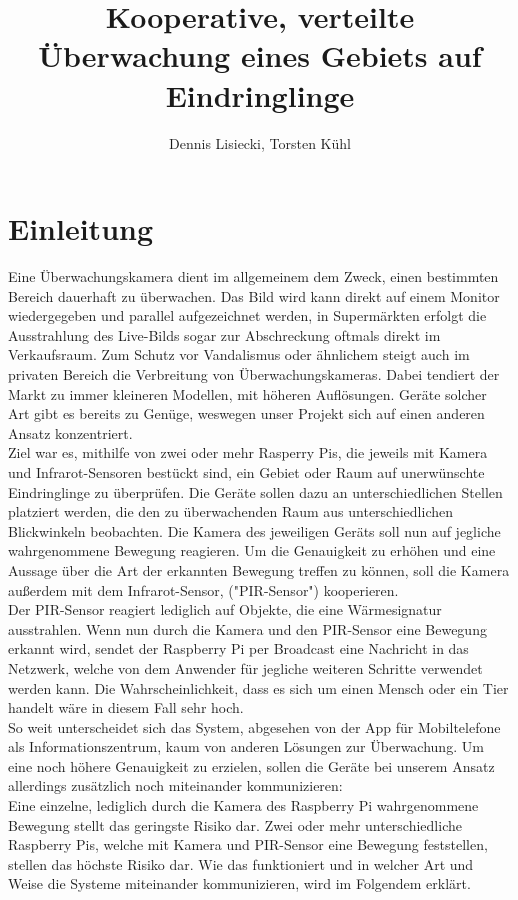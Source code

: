 \documentclass[journal]{IEEEtran}
\title{Kooperative, verteilte Überwachung eines Gebiets auf Eindringlinge}		%
\author{Dennis Lisiecki, Torsten Kühl}								%
\begin{document}

\maketitle	%


\section{Einleitung}
Eine Überwachungskamera dient im allgemeinem dem Zweck, einen bestimmten Bereich dauerhaft zu überwachen. Das Bild wird kann direkt auf einem Monitor wiedergegeben und parallel aufgezeichnet werden, in Supermärkten erfolgt die Ausstrahlung des Live-Bilds sogar zur Abschreckung oftmals direkt im Verkaufsraum. Zum Schutz vor Vandalismus oder ähnlichem steigt auch im privaten Bereich die Verbreitung von Überwachungskameras. Dabei tendiert der Markt zu immer kleineren Modellen, mit höheren Auflösungen. Geräte solcher Art gibt es bereits zu Genüge, weswegen unser Projekt sich auf einen anderen Ansatz konzentriert.\\ Ziel war es, mithilfe von zwei oder mehr Rasperry Pis, die jeweils mit Kamera und Infrarot-Sensoren bestückt sind, ein Gebiet oder Raum auf unerwünschte Eindringlinge zu überprüfen. Die Geräte sollen dazu an unterschiedlichen Stellen platziert werden, die den zu überwachenden Raum aus unterschiedlichen Blickwinkeln beobachten. Die Kamera des jeweiligen Geräts soll nun auf jegliche wahrgenommene Bewegung reagieren. Um die Genauigkeit zu erhöhen und eine Aussage über die Art der erkannten Bewegung treffen zu können, soll die Kamera außerdem mit dem Infrarot-Sensor, ("PIR-Sensor") kooperieren.\\ Der PIR-Sensor reagiert lediglich auf Objekte, die eine Wärmesignatur ausstrahlen. Wenn nun durch die Kamera und den PIR-Sensor eine Bewegung erkannt wird, sendet der Raspberry Pi per Broadcast eine Nachricht in das Netzwerk, welche von dem Anwender für jegliche weiteren Schritte verwendet werden kann. Die Wahrscheinlichkeit, dass es sich um einen Mensch oder ein Tier handelt wäre in diesem Fall sehr hoch.\\ So weit unterscheidet sich das System, abgesehen von der App für Mobiltelefone als Informationszentrum, kaum von anderen Lösungen zur Überwachung. Um eine noch höhere Genauigkeit zu erzielen, sollen die Geräte bei unserem Ansatz allerdings zusätzlich noch miteinander kommunizieren:\\ Eine einzelne, lediglich durch die Kamera des Raspberry Pi wahrgenommene Bewegung stellt das geringste Risiko dar. Zwei oder mehr unterschiedliche Raspberry Pis, welche mit Kamera und PIR-Sensor eine Bewegung feststellen, stellen das höchste Risiko dar. Wie das funktioniert und in welcher Art und Weise die Systeme miteinander kommunizieren, wird im Folgendem erklärt.
\end{document}
